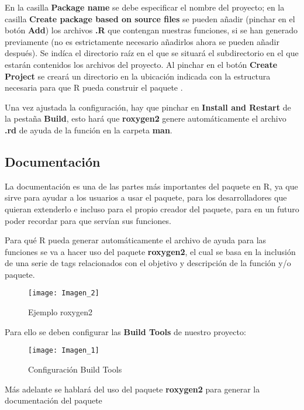 En la casilla \textbf{Package name} se debe especificar el nombre del  proyecto; en la casilla
\textbf{Create package based on source files} se pueden a\~nadir (pinchar en el bot\'on \textbf{Add}) los
archivos \textbf{.R} que contengan nuestras funciones, si se han generado previamente (no es
estrictamente necesario a\~nadirlos ahora se pueden a\~nadir despu\'es).
Se ind\'ica el directorio ra\'iz en el que se situar\'a el subdirectorio en el que estar\'an contenidos los archivos del proyecto. 
Al pinchar en el bot\'on \textbf{Create Project} se crear\'a un directorio en la ubicaci\'on indicada con la
estructura necesaria para que R pueda construir el paquete \cite{datavu}.

Una vez ajustada la configuraci\'on, hay que pinchar en \textbf{Install and Restart} de la pesta\~na \textbf{Build}, esto har\'a que \textbf{roxygen2} genere autom\'aticamente el archivo \textbf{.rd} de ayuda de la funci\'on en la carpeta \textbf{man}.

\subsection{Documentaci\'on}
La documentaci\'on es una de las partes m\'as importantes del paquete en R, ya que sirve para ayudar a los usuarios a usar el paquete, para los desarrolladores que quieran extenderlo e
incluso para el propio creador del paquete, para en un futuro poder recordar para que serv\'ian sus funciones.

Para qu\'e R pueda generar autom\'aticamente el archivo de ayuda para las funciones
se va a hacer uso del paquete \textbf{roxygen2}, el cual se basa en la inclusi\'on de una serie de tags relacionados con el objetivo y descripci\'on de la funci\'on y/o paquete. 


\begin{figure}[H]
    \centering
    \texttt{[image: Imagen\_2]}
    \caption{Ejemplo roxygen2   }
    \label{fig:roxygen}
\end{figure} 

Para ello se deben configurar las \textbf{Build Tools} de nuestro proyecto:

\begin{figure}[H]
    \centering
    \texttt{[image: Imagen\_1]}
    \caption{Configuraci\'on Build Tools }
    \label{fig:build_tools}
\end{figure} 

M\'as adelante se hablar\'a del uso del paquete \textbf{roxygen2} para generar la documentaci\'on del paquete

